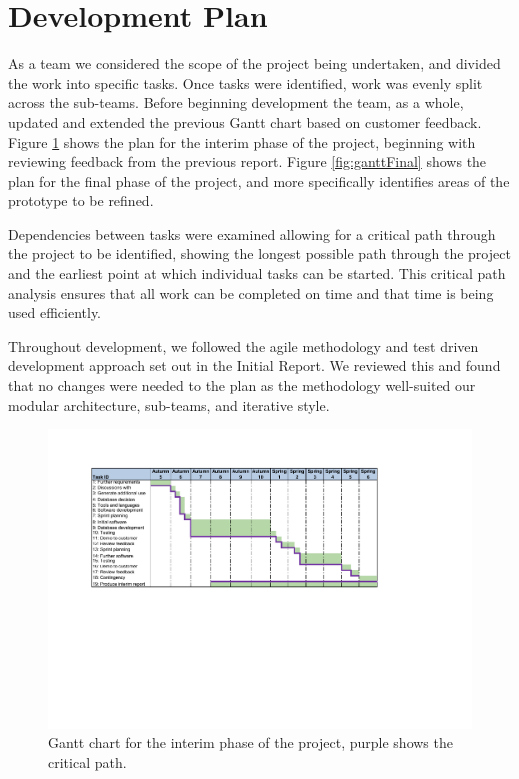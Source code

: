 \section{Development Plan}
\label{sec:developmentplan}

As a team we considered the scope of the project being undertaken, and 
divided the work into specific tasks. Once tasks were identified, work was 
evenly split across the sub-teams.
Before beginning development the team, as a whole, updated and extended 
the previous Gantt chart based on customer feedback.
Figure \ref{fig:ganttInterim}  shows the plan for the interim phase of the project, 
beginning with reviewing feedback from the previous report.
Figure \ref{fig:ganttFinal}  shows the plan for the final phase of the project, and 
more specifically identifies areas of the prototype to be refined.

Dependencies between tasks were examined allowing for a critical path 
through the project to be identified, showing the longest possible path through 
the project and the earliest point at which individual tasks can be started.
This critical path analysis ensures that all work can be completed on time and 
that time is being used efficiently. 

Throughout development, we followed the agile methodology and test driven development approach set out in the Initial Report. We reviewed this and found that no changes were needed to the plan as the methodology well-suited our modular architecture, sub-teams, and iterative style.

\begin{figure}[ht!]
  \centering
  \includegraphics[width= 15cm]{images/GantInterim.pdf}
  \caption{Gantt chart for the interim phase of the project, purple shows the critical path.}
  \label{fig:ganttInterim}
\end{figure}

